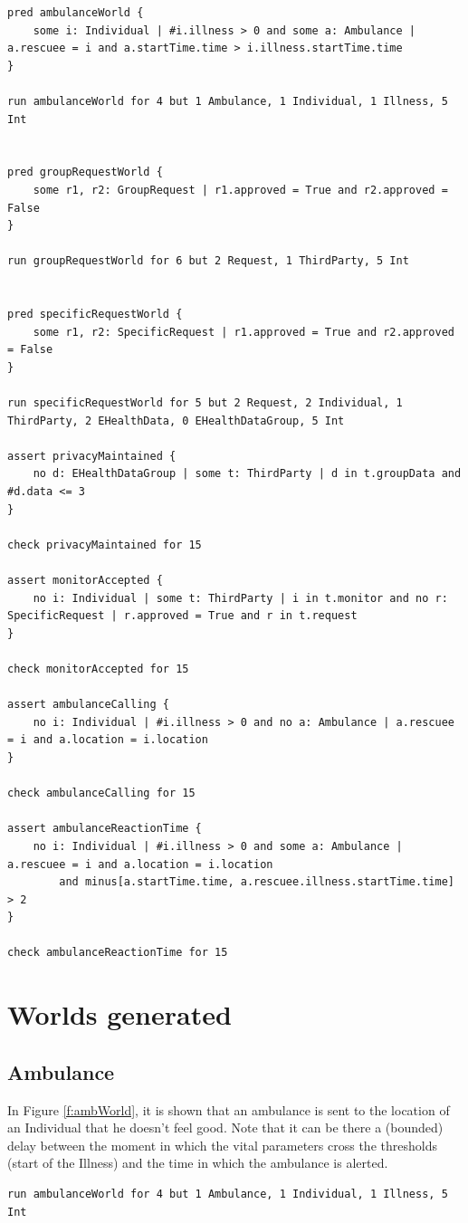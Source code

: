 \begin{verbatim}
pred ambulanceWorld {
	some i: Individual | #i.illness > 0 and some a: Ambulance | a.rescuee = i and a.startTime.time > i.illness.startTime.time
}

run ambulanceWorld for 4 but 1 Ambulance, 1 Individual, 1 Illness, 5 Int


pred groupRequestWorld {
	some r1, r2: GroupRequest | r1.approved = True and r2.approved = False
}

run groupRequestWorld for 6 but 2 Request, 1 ThirdParty, 5 Int


pred specificRequestWorld {
	some r1, r2: SpecificRequest | r1.approved = True and r2.approved = False
}

run specificRequestWorld for 5 but 2 Request, 2 Individual, 1 ThirdParty, 2 EHealthData, 0 EHealthDataGroup, 5 Int

assert privacyMaintained {
	no d: EHealthDataGroup | some t: ThirdParty | d in t.groupData and #d.data <= 3
}

check privacyMaintained for 15

assert monitorAccepted {
	no i: Individual | some t: ThirdParty | i in t.monitor and no r: SpecificRequest | r.approved = True and r in t.request
}

check monitorAccepted for 15

assert ambulanceCalling {
	no i: Individual | #i.illness > 0 and no a: Ambulance | a.rescuee = i and a.location = i.location
}

check ambulanceCalling for 15

assert ambulanceReactionTime {
	no i: Individual | #i.illness > 0 and some a: Ambulance | a.rescuee = i and a.location = i.location 
		and minus[a.startTime.time, a.rescuee.illness.startTime.time] > 2
}

check ambulanceReactionTime for 15
\end{verbatim}




\section{Worlds generated}

\subsection{Ambulance}
In Figure \ref{f:ambWorld}, it is shown that an ambulance is sent to the location of an Individual that he doesn't feel good.
Note that it can be there a (bounded) delay between the moment in which the vital parameters cross the thresholds (start of the Illness) and the time in which the ambulance is alerted.
\begin{verbatim}
run ambulanceWorld for 4 but 1 Ambulance, 1 Individual, 1 Illness, 5 Int
\end{verbatim}

